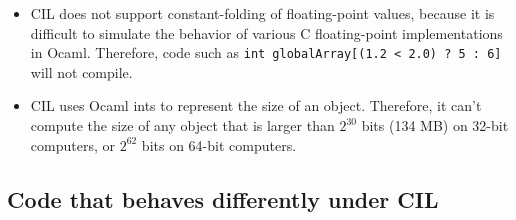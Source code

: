 \documentclass{article}
\def\t#1{{\tt #1}}
\begin{document}
\begin{itemize}
\item CIL does not support constant-folding of floating-point values,
  because it is difficult to simulate the behavior of various
  C floating-point implementations in Ocaml.  Therefore, code such as
  \t{int globalArray[(1.2 < 2.0) ? 5 : 6]} will not compile.

\item CIL uses Ocaml ints to represent the size of an object.
  Therefore, it can't compute the size of any object that is larger
  than $2^{30}$ bits (134 MB) on 32-bit computers, or $2^{62}$ bits on
  64-bit computers.

\end{itemize}

\subsection{Code that behaves differently under CIL}
\end{document}
